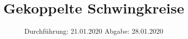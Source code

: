

\subject{Versuchsnummer: 355}
\title{Gekoppelte Schwingkreise}
\date{%
  Durchführung: 21.01.2020
  \hspace{3em}
  Abgabe: 28.01.2020
}



\maketitle
\thispagestyle{empty}
\tableofcontents
\newpage




\newpage
\nocite{*}
\printbibliography


